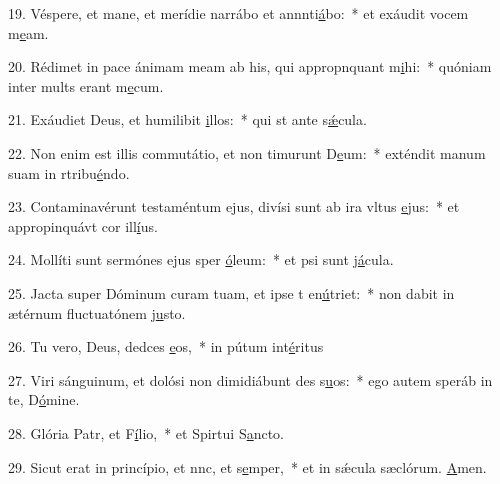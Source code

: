 19. Véspere, et mane, et merídie narrábo et annnti\uline{á}bo:~* et exáudit vocem m\uline{e}am.\par 
20. Rédimet in pace ánimam meam ab his, qui appropnquant m\uline{i}hi:~* quóniam inter mults erant m\uline{e}cum.\par 
21. Exáudiet Deus, et humilibit \uline{i}llos:~* qui st ante s\uline{ǽ}cula.\par 
22. Non enim est illis commutátio, et non timurunt D\uline{e}um:~* exténdit manum suam in rtribu\uline{é}ndo.\par 
23. Contaminavérunt testaméntum ejus, divísi sunt ab ira vltus \uline{e}jus:~* et appropinquávt cor ill\uline{í}us.\par 
24. Mollíti sunt sermónes ejus sper \uline{ó}leum:~* et psi sunt j\uline{á}cula.\par 
25. Jacta super Dóminum curam tuam, et ipse t en\uline{ú}triet:~* non dabit in ætérnum fluctuatónem j\uline{u}sto.\par 
26. Tu vero, Deus, dedces \uline{e}os,~* in pútum int\uline{é}ritus\par 
27. Viri sánguinum, et dolósi non dimidiábunt des s\uline{u}os:~* ego autem speráb in te, D\uline{ó}mine.\par 
28. Glória Patr, et F\uline{í}lio,~* et Spirtui S\uline{a}ncto.\par 
29. Sicut erat in princípio, et nnc, et s\uline{e}mper,~* et in sǽcula sæclórum. \uline{A}men.\par 
